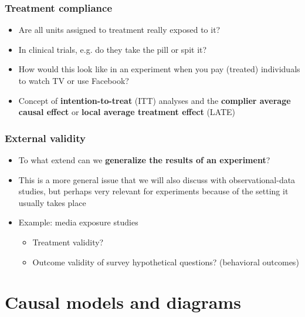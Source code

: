 \documentclass[aspectratio=43]{beamer}
\begin{document}
\begin{frame}
\frametitle{Treatment compliance}
\centering

\begin{itemize}
  \item Are all units assigned to treatment really exposed to it?
  \item In clinical trials, e.g. do they take the pill or spit it?
  \item How would this look like in an experiment when you pay (treated) individuals to watch TV or use Facebook?
  \item Concept of \textbf{intention-to-treat} (ITT) analyses and the \textbf{complier average causal effect} or \textbf{local average treatment effect} (LATE)
\end{itemize}

\end{frame}

\begin{frame}
\frametitle{External validity}
\centering

\begin{itemize}
  \item To what extend can we \textbf{generalize the results of an experiment}?
  \item This is a more general issue that we will also discuss with observational-data studies, but perhaps very relevant for experiments because of the setting it usually takes place
  \item Example: media exposure studies
  \begin{itemize}
    \item Treatment validity?
    \item Outcome validity of survey hypothetical questions? (behavioral outcomes)
  \end{itemize}
\end{itemize}

\end{frame}

\section{Causal models and diagrams}
\end{document}
